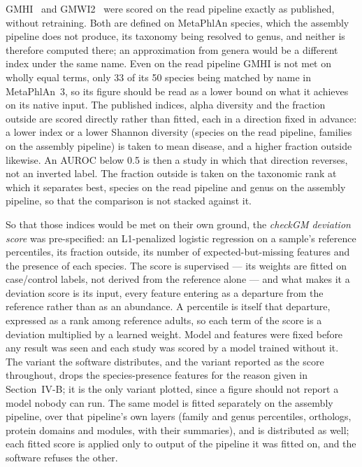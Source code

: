\documentclass[conference]{IEEEtran}
\begin{document}
GMHI~\cite{gupta2020} and GMWI2~\cite{chang2024} were scored on the read pipeline exactly as published, without retraining. Both are defined on MetaPhlAn species, which the assembly pipeline does not produce, its taxonomy being resolved to genus, and neither is therefore computed there; an approximation from genera would be a different index under the same name. Even on the read pipeline GMHI is not met on wholly equal terms, only 33 of its 50 species being matched by name in MetaPhlAn~3, so its figure should be read as a lower bound on what it achieves on its native input. The published indices, alpha diversity and the fraction outside are scored directly rather than fitted, each in a direction fixed in advance: a lower index or a lower Shannon diversity (species on the read pipeline, families on the assembly pipeline) is taken to mean disease, and a higher fraction outside likewise. An AUROC below 0.5 is then a study in which that direction reverses, not an inverted label. The fraction outside is taken on the taxonomic rank at which it separates best, species on the read pipeline and genus on the assembly pipeline, so that the comparison is not stacked against it.

So that those indices would be met on their own ground, the \emph{checkGM deviation score} was pre-specified: an L1-penalized logistic regression on a sample's reference percentiles, its fraction outside, its number of expected-but-missing features and the presence of each species. The score is supervised --- its weights are fitted on case/control labels, not derived from the reference alone --- and what makes it a deviation score is its input, every feature entering as a departure from the reference rather than as an abundance. A percentile is itself that departure, expressed as a rank among reference adults, so each term of the score is a deviation multiplied by a learned weight. Model and features were fixed before any result was seen and each study was scored by a model trained without it. The variant the software distributes, and the variant reported as the score throughout, drops the species-presence features for the reason given in Section~IV-B; it is the only variant plotted, since a figure should not report a model nobody can run. The same model is fitted separately on the assembly pipeline, over that pipeline's own layers (family and genus percentiles, orthologs, protein domains and modules, with their summaries), and is distributed as well; each fitted score is applied only to output of the pipeline it was fitted on, and the software refuses the other.
\end{document}
